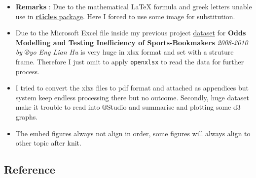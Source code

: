\documentclass[article]{jss}
\providecommand{\tightlist}{%
  \setlength{\itemsep}{0pt}\setlength{\parskip}{0pt}}
\begin{document}
\begin{itemize}
\tightlist
\item
  \textbf{Remarks} : Due to the mathematical LaTeX formula and greek
  letters unable use in
  \href{https://github.com/rstudio/rticles}{\textbf{rticles} package}.
  Here I forced to use some image for substitution.
\item
  Due to the Microsoft Excel file inside my previous project
  \href{https://www.dropbox.com/home/Research\%20Project\%202}{dataset}
  for \textbf{Odds Modelling and Testing Inefficiency of
  Sports-Bookmakers} \emph{2008-2010 by ®yo Eng Lian Hu} is very huge in
  xlsx format and set with a struture frame. Therefore I just omit to
  apply \texttt{openxlsx} to read the data for further process.
\item
  I tried to convert the xlxs files to pdf format and attached as
  appendices but system keep endless processing there but no outcome.
  Secondly, huge dataset make it trouble to read into ®Studio and
  summarise and plotting some d3 graphs.
\item
  The embed figures always not align in order, some figures will always
  align to other topic after knit.
\end{itemize}

\subsection{Reference}\label{reference}
\end{document}
